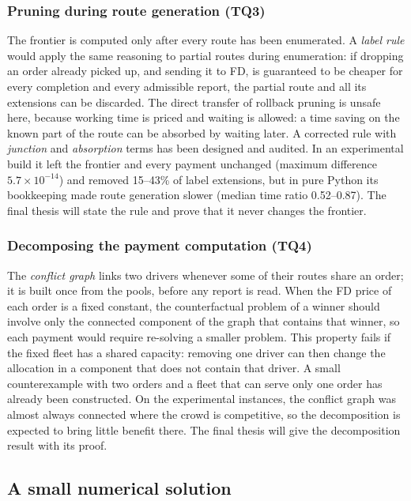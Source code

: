 \subsubsection{Pruning during route generation (TQ3)}
\label{sec:sd-label}

The frontier is computed only after every route has been enumerated. A
\emph{label rule} would apply the same reasoning to partial routes during
enumeration: if dropping an order already picked up, and sending it to FD,
is guaranteed to be cheaper for every completion and every admissible report,
the partial route and all its extensions can be discarded. The direct
transfer of rollback pruning \citep{lozano2016exact} is unsafe here, because
working time is priced and waiting is allowed: a time saving on the known
part of the route can be absorbed by waiting later. A corrected rule with
\emph{junction} and \emph{absorption} terms has been designed and audited.
In an experimental build it left the frontier and every payment unchanged
(maximum difference $5.7\times10^{-14}$) and removed 15--43\% of label
extensions, but in pure Python its bookkeeping made route generation slower
(median time ratio 0.52--0.87). The final thesis will state the rule and
prove that it never changes the frontier.

\subsubsection{Decomposing the payment computation (TQ4)}
\label{sec:sd-decomp}

The \emph{conflict graph} links two drivers whenever some of their routes
share an order; it is built once from the pools, before any report is
read. When the FD price of each order is a fixed constant, the
counterfactual problem of a winner should involve only the connected
component of the graph that contains that winner, so each payment would
require re-solving a smaller problem. This property fails if the fixed fleet
has a shared capacity: removing one driver can then change the allocation in
a component that does not contain that driver. A small counterexample with
two orders and a fleet that can serve only one order has already been
constructed. On the experimental instances, the conflict graph was almost
always connected where the crowd is competitive, so the decomposition is
expected to bring little benefit there. The final thesis will give the
decomposition result with its proof.
\subsection{A small numerical solution}
\label{sec:sd-example}

